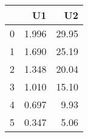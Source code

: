 \begin{tabular}{lrr}
\toprule
{} &     U1 &     U2 \\
\midrule
0 &  1.996 &  29.95 \\
1 &  1.690 &  25.19 \\
2 &  1.348 &  20.04 \\
3 &  1.010 &  15.10 \\
4 &  0.697 &   9.93 \\
5 &  0.347 &   5.06 \\
\bottomrule
\end{tabular}
